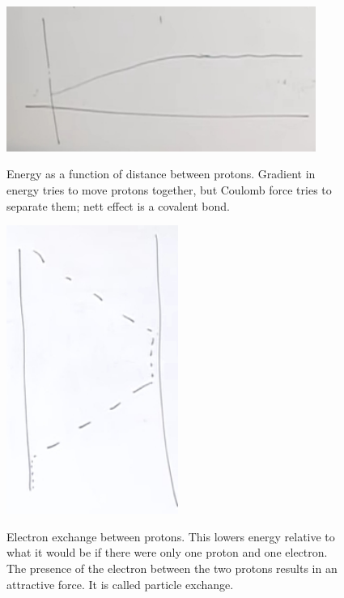 \documentclass[]{article}
\begin{document}
\begin{figure}[H]
	\caption[Energy as a function of distance between protons]{Energy as a function of distance between protons. Gradient in energy tries to move protons together, but Coulomb force tries to separate them; nett effect is a covalent bond.}
	\includegraphics[width=0.9\textwidth]{2proton1ElectronEnergy}\label{fig:2proton1ElectronEnergy}
\end{figure}

\begin{figure}[H]
	\begin{center}
		\caption[Electron exchange between protons]{Electron exchange between protons. This lowers energy relative to what it would be if there were only one proton and one electron. The presence of the electron between the two protons results in an attractive force. It is called particle exchange.}
		\includegraphics[width=0.5\textwidth]{2proton1ElectronHopping}\label{fig:2proton1ElectronHopping}
	\end{center}
\end{figure}
\end{document}
